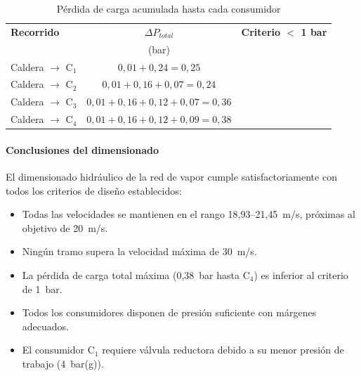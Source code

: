 \begin{table}[H]
	\centering
	\caption{Pérdida de carga acumulada hasta cada consumidor}
	\label{tab:perdidas-acumuladas}
	\begin{tabular}{lcc}
		\toprule
		\textbf{Recorrido}          & \textbf{$\Delta P_{total}$}                  & \textbf{Criterio $<$ 1 bar} \\
		                            & (bar)                                        &                             \\
		\midrule
		Caldera $\rightarrow$ C$_1$ & $0{,}01 + 0{,}24 = 0{,}25$                   & \checkmark                  \\
		Caldera $\rightarrow$ C$_2$ & $0{,}01 + 0{,}16 + 0{,}07 = 0{,}24$          & \checkmark                  \\
		Caldera $\rightarrow$ C$_3$ & $0{,}01 + 0{,}16 + 0{,}12 + 0{,}07 = 0{,}36$ & \checkmark                  \\
		Caldera $\rightarrow$ C$_4$ & $0{,}01 + 0{,}16 + 0{,}12 + 0{,}09 = 0{,}38$ & \checkmark                  \\
		\bottomrule
	\end{tabular}
\end{table}

\paragraph{Conclusiones del dimensionado}

El dimensionado hidráulico de la red de vapor cumple satisfactoriamente con todos los criterios de diseño establecidos:

\begin{itemize}[noitemsep]
	\item Todas las velocidades se mantienen en el rango 18{,}93--21{,}45~m/s, próximas al objetivo de 20~m/s.
	\item Ningún tramo supera la velocidad máxima de 30~m/s.
	\item La pérdida de carga total máxima (0{,}38~bar hasta C$_4$) es inferior al criterio de 1~bar.
	\item Todos los consumidores disponen de presión suficiente con márgenes adecuados.
	\item El consumidor C$_1$ requiere válvula reductora debido a su menor presión de trabajo (4~bar(g)).
\end{itemize}


